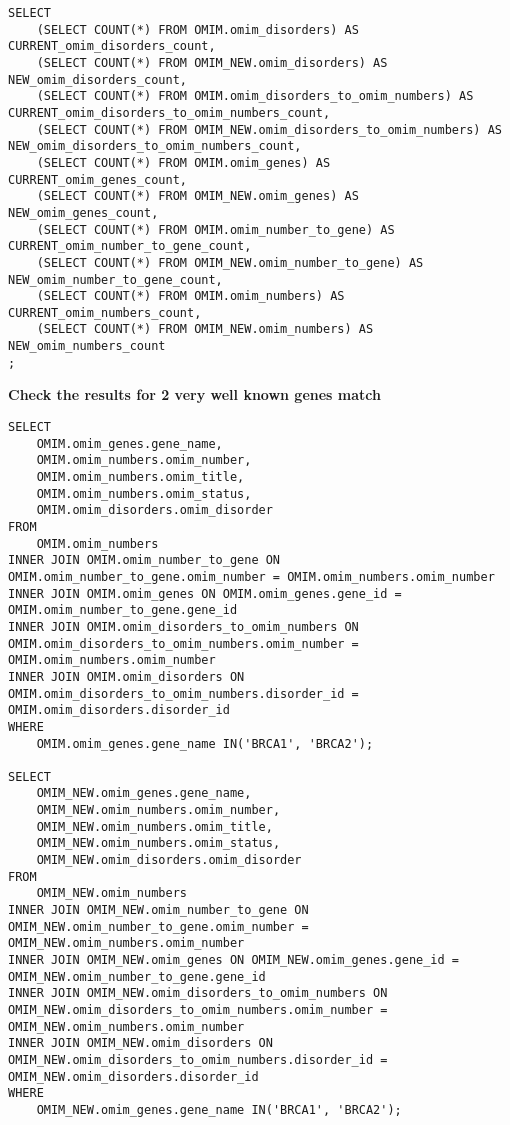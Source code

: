 \documentclass[11pt, a4paper]{article}
\begin{document}
\begin{lstlisting}
SELECT 
	(SELECT COUNT(*) FROM OMIM.omim_disorders) AS CURRENT_omim_disorders_count,
	(SELECT COUNT(*) FROM OMIM_NEW.omim_disorders) AS NEW_omim_disorders_count,
	(SELECT COUNT(*) FROM OMIM.omim_disorders_to_omim_numbers) AS CURRENT_omim_disorders_to_omim_numbers_count,
	(SELECT COUNT(*) FROM OMIM_NEW.omim_disorders_to_omim_numbers) AS NEW_omim_disorders_to_omim_numbers_count,
	(SELECT COUNT(*) FROM OMIM.omim_genes) AS CURRENT_omim_genes_count,
	(SELECT COUNT(*) FROM OMIM_NEW.omim_genes) AS NEW_omim_genes_count,
	(SELECT COUNT(*) FROM OMIM.omim_number_to_gene) AS CURRENT_omim_number_to_gene_count,
	(SELECT COUNT(*) FROM OMIM_NEW.omim_number_to_gene) AS NEW_omim_number_to_gene_count,
	(SELECT COUNT(*) FROM OMIM.omim_numbers) AS CURRENT_omim_numbers_count,
	(SELECT COUNT(*) FROM OMIM_NEW.omim_numbers) AS NEW_omim_numbers_count
;
\end{lstlisting}

\textbf{Check the results for 2 very well known genes match}

\begin{lstlisting}
SELECT 
	OMIM.omim_genes.gene_name, 
	OMIM.omim_numbers.omim_number, 
	OMIM.omim_numbers.omim_title, 
	OMIM.omim_numbers.omim_status, 
	OMIM.omim_disorders.omim_disorder 
FROM 
	OMIM.omim_numbers 
INNER JOIN OMIM.omim_number_to_gene ON OMIM.omim_number_to_gene.omim_number = OMIM.omim_numbers.omim_number 
INNER JOIN OMIM.omim_genes ON OMIM.omim_genes.gene_id = OMIM.omim_number_to_gene.gene_id 
INNER JOIN OMIM.omim_disorders_to_omim_numbers ON OMIM.omim_disorders_to_omim_numbers.omim_number = OMIM.omim_numbers.omim_number 
INNER JOIN OMIM.omim_disorders ON OMIM.omim_disorders_to_omim_numbers.disorder_id = OMIM.omim_disorders.disorder_id 
WHERE 
	OMIM.omim_genes.gene_name IN('BRCA1', 'BRCA2'); 

SELECT 
	OMIM_NEW.omim_genes.gene_name, 
	OMIM_NEW.omim_numbers.omim_number, 
	OMIM_NEW.omim_numbers.omim_title, 
	OMIM_NEW.omim_numbers.omim_status, 
	OMIM_NEW.omim_disorders.omim_disorder 
FROM 
	OMIM_NEW.omim_numbers 
INNER JOIN OMIM_NEW.omim_number_to_gene ON OMIM_NEW.omim_number_to_gene.omim_number = OMIM_NEW.omim_numbers.omim_number 
INNER JOIN OMIM_NEW.omim_genes ON OMIM_NEW.omim_genes.gene_id = OMIM_NEW.omim_number_to_gene.gene_id 
INNER JOIN OMIM_NEW.omim_disorders_to_omim_numbers ON OMIM_NEW.omim_disorders_to_omim_numbers.omim_number = OMIM_NEW.omim_numbers.omim_number 
INNER JOIN OMIM_NEW.omim_disorders ON OMIM_NEW.omim_disorders_to_omim_numbers.disorder_id = OMIM_NEW.omim_disorders.disorder_id 
WHERE 
	OMIM_NEW.omim_genes.gene_name IN('BRCA1', 'BRCA2');
\end{lstlisting}
\end{document}
